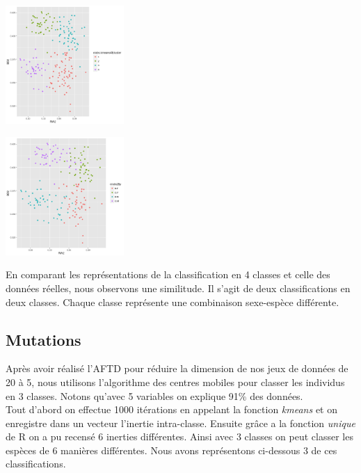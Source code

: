\documentclass[10pt]{article}
\begin{document}
\begin{center}
	\includegraphics[width=45mm]{Figures/Crabs2_2/kmeans4.png}
	\label{fig:iris_kmeans4}
\end{center}
\begin{center}
	\includegraphics[width=45mm]{Figures/Crabs2_2/plotRealData.png}
	\label{fig:iris_kmeansReal}
\end{center}
En comparant les représentations de la classification en 4 classes et celle des données réelles, nous observons une similitude. Il s'agit de deux classifications en deux classes. Chaque classe représente une combinaison sexe-espèce différente. 

\subsection{Mutations}
Après avoir réalisé l'AFTD pour réduire la dimension de nos jeux de données de 20 à 5, nous utilisons l'algorithme des centres mobiles pour classer les individus en 3 classes. Notons qu'avec 5 variables on explique 91\% des données.\\
Tout d'abord on effectue 1000 itérations en appelant la fonction \textit{kmeans} et on enregistre dans un vecteur l'inertie  intra-classe. Ensuite grâce a la fonction \textit{unique} de R on a pu recensé  6 inerties différentes. Ainsi avec 3 classes on peut classer les espèces de 6 manières différentes. Nous avons représentons ci-dessous 3 de ces classifications.\\
\end{document}
